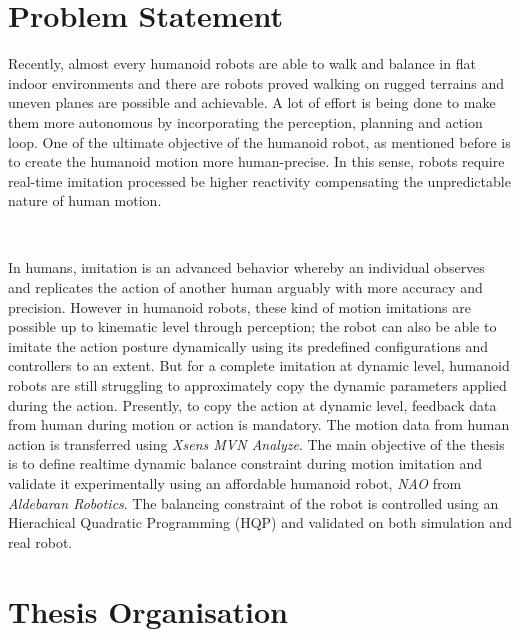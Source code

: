 \section{Problem Statement}

Recently, almost every humanoid robots are able to walk and balance in flat indoor environments and there are robots 
proved walking on rugged terrains and uneven planes are possible and achievable. A lot of effort is being done to make
them more autonomous by incorporating the perception, planning and action loop. One of the ultimate objective of the 
humanoid robot, as mentioned before is to create the humanoid motion more human-precise. In this sense, robots require 
real-time imitation processed be higher reactivity compensating the unpredictable nature of human motion.

~

In humans, imitation is an advanced behavior whereby an individual observes and replicates the action of another 
human arguably with more accuracy and precision. However in humanoid robots, these kind of motion imitations are possible
up to kinematic level through perception; the robot can also be able to imitate the action posture dynamically using its predefined 
configurations and controllers to an extent. But for a complete imitation at dynamic level, humanoid robots are still struggling to 
approximately copy the dynamic parameters applied during the action. Presently, to copy the action at dynamic level, 
feedback data from human during motion or action is mandatory. The motion data from human action is transferred using 
\textit{Xsens MVN Analyze}. The main objective of the thesis is to define realtime dynamic balance constraint during
motion imitation and validate it experimentally using an affordable humanoid robot, \textit{NAO} from \textit{Aldebaran
Robotics}. The balancing constraint of the robot is controlled using an Hierachical Quadratic Programming (HQP) and validated on both 
simulation and real robot.

\section{Thesis Organisation}
